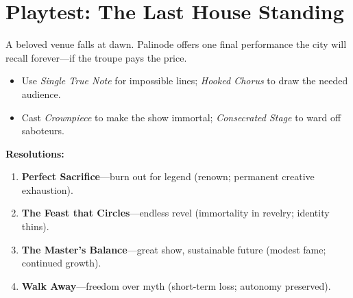 \section*{Playtest: The Last House Standing}
\label{sec:palinode-playtest}
A beloved venue falls at dawn. Palinode offers one final performance the city will recall forever---if the troupe pays the price.
\begin{itemize}
\item Use \emph{Single True Note} for impossible lines; \emph{Hooked Chorus} to draw the needed audience.
\item Cast \emph{Crownpiece} to make the show immortal; \emph{Consecrated Stage} to ward off saboteurs.
\end{itemize}
\textbf{Resolutions:}
\begin{enumerate}
\item \textbf{Perfect Sacrifice}---burn out for legend (renown; permanent creative exhaustion).
\item \textbf{The Feast that Circles}---endless revel (immortality in revelry; identity thins).
\item \textbf{The Master's Balance}---great show, sustainable future (modest fame; continued growth).
\item \textbf{Walk Away}---freedom over myth (short-term loss; autonomy preserved).
\end{enumerate}


